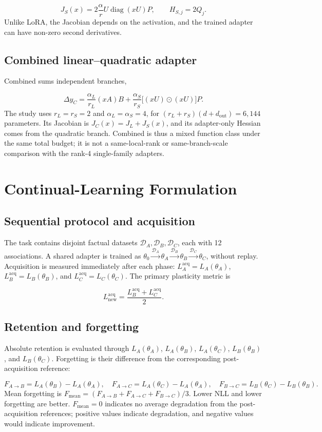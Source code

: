 \documentclass[12pt,a4paper]{article}
\begin{document}
\[
J_S(x)=2\frac{\alpha}{r}U\operatorname{diag}(xU)P,
\qquad H_{S,j}=2Q_j.
\]
Unlike LoRA, the Jacobian depends on the activation, and the trained adapter can have non-zero second derivatives.

\subsection{Combined linear–quadratic adapter}
Combined sums independent branches,

\[
\Delta y_C=\frac{\alpha_L}{r_L}(xA)B+
\frac{\alpha_S}{r_S}\big[(xU)\odot(xU)\big]P.
\]
The study uses \(r_L=r_S=2\) and \(\alpha_L=\alpha_S=4\), for \((r_L+r_S)(d+d_{\mathrm{out}})=6{,}144\) parameters. Its Jacobian is \(J_C(x)=J_L+J_S(x)\), and its adapter-only Hessian comes from the quadratic branch. Combined is thus a mixed function class under the same total budget; it is not a same-local-rank or same-branch-scale comparison with the rank-4 single-family adapters.

\section{Continual-Learning Formulation}
\subsection{Sequential protocol and acquisition}
The task contains disjoint factual datasets \(\mathcal D_A,\mathcal D_B,\mathcal D_C\), each with 12 associations. A shared adapter is trained as \(\theta_0\overset{\mathcal D_A}{\longrightarrow}\theta_A\overset{\mathcal D_B}{\longrightarrow}\theta_B\overset{\mathcal D_C}{\longrightarrow}\theta_C\), without replay. Acquisition is measured immediately after each phase: \(L_A^{\mathrm{acq}}=L_A(\theta_A)\), \(L_B^{\mathrm{acq}}=L_B(\theta_B)\), and \(L_C^{\mathrm{acq}}=L_C(\theta_C)\). The primary plasticity metric is

\[
L_{\mathrm{new}}^{\mathrm{acq}}=\frac{L_B^{\mathrm{acq}}+L_C^{\mathrm{acq}}}{2}.
\]
\subsection{Retention and forgetting}
Absolute retention is evaluated through \(L_A(\theta_A)\), \(L_A(\theta_B)\), \(L_A(\theta_C)\), \(L_B(\theta_B)\), and \(L_B(\theta_C)\). Forgetting is their difference from the corresponding post-acquisition reference:

\[
F_{A\rightarrow B}=L_A(\theta_B)-L_A(\theta_A),\quad
F_{A\rightarrow C}=L_A(\theta_C)-L_A(\theta_A),\quad
F_{B\rightarrow C}=L_B(\theta_C)-L_B(\theta_B).
\]
Mean forgetting is \(F_{\mathrm{mean}}=(F_{A\rightarrow B}+F_{A\rightarrow C}+F_{B\rightarrow C})/3\). Lower NLL and lower forgetting are better. \(F_{\mathrm{mean}}=0\) indicates no average degradation from the post-acquisition references; positive values indicate degradation, and negative values would indicate improvement.
\end{document}

